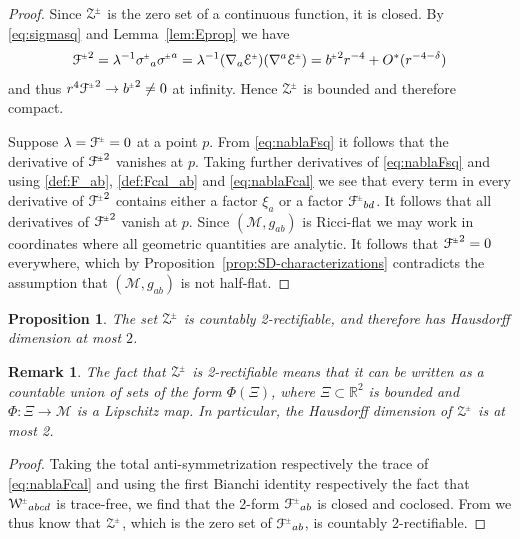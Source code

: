 \documentclass[a4paper,10pt,reqno]{amsart}
\newcommand{\Reals}{\mathbb{R}}
\newcommand{\cE}{\mathcal{E}}
\newcommand{\cZ}{\mathcal{Z}}
\newcommand{\cM}{\mathcal{M}}
\newcommand{\cF}{\mathcal{F}}
\theoremstyle{plain}
\newtheorem{prop}[thm]{Proposition}
\newtheorem{remark}[thm]{Remark}
\newcommand{\PM}[1]{{{#1}^{\hspace{-.5pt}\scaleto{\pm}{3.5pt}}}}
\def\Wcal{\mathcal{W}}
\def\Fcal{\mathcal{F}}
\numberwithin{equation}{section}
\begin{document}
\begin{proof}
Since $\PM{\cZ}$ is the zero set of a continuous function, it is closed. By \eqref{eq:sigmasq} and Lemma~\ref{lem:Eprop} we have
\begin{align} \label{Fcalasymp}
\PM{\Fcal}^2
= \lambda^{-1} \PM{\sigma}_{a} \PM{\sigma}^{a}
= \lambda^{-1}(\nabla_a\PM{\cE})(\nabla^a\PM{\cE})
=\PM{b}^2 r^{-4} + O^*(r^{-4-\delta})
\end{align}
and thus $r^4 \PM{\Fcal}^2 \to \PM{b}^2 \neq 0$ at infinity. Hence $\PM{\cZ}$ is bounded and therefore compact.

Suppose $\lambda = \PM{\Fcal} = 0$ at a point $p$. From \eqref{eq:nablaFsq} it follows that the derivative of $\PM{\Fcal}^2$ vanishes at $p$. Taking further derivatives of \eqref{eq:nablaFsq} and using \eqref{def:F_ab}, \eqref{def:Fcal_ab} and \eqref{eq:nablaFcal} we see that every term in every derivative of $\PM{\Fcal}^2$ contains either a factor $\xi_a$ or a factor $\PM\cF_{bd}$. It follows that all derivatives of $\PM{\Fcal}^2$ vanish at $p$. Since $(\cM, g_{ab})$ is Ricci-flat we may work in coordinates where all geometric quantities are analytic. It follows that $\PM{\Fcal}^2 = 0$ everywhere, which by Proposition~\ref{prop:SD-characterizations} contradicts the assumption that $(\cM, g_{ab})$ is not half-flat.
\end{proof}

\begin{prop} \label{prop:baer}
The set $\PM{\cZ}$ is countably 2-rectifiable, and therefore has Hausdorff dimension at most $2$.
\end{prop}
\begin{remark} 
The fact that $\PM{\cZ}$ is 2-rectifiable means that it can be written as a countable union of sets of the form $\Phi(\Xi)$, where $\Xi \subset \Reals^2$ is bounded and $\Phi: \Xi \to \cM$ is a Lipschitz map. In particular, the Hausdorff dimension of $\PM{\cZ}$ is at most 2.  
\end{remark} 

\begin{proof}
Taking the total anti-symmetrization respectively the trace of \eqref{eq:nablaFcal} and using the first Bianchi identity respectively the fact that $\PM\Wcal_{abcd}$ is trace-free, we find that the 2-form $\PM\cF_{ab}$ is closed and coclosed. From \cite[Main~Theorem]{Bar-nodal-sets} we thus know that $\PM\cZ$, which is the zero set of $\PM\cF_{ab}$, is countably 2-rectifiable. 
\end{proof}
\end{document}
